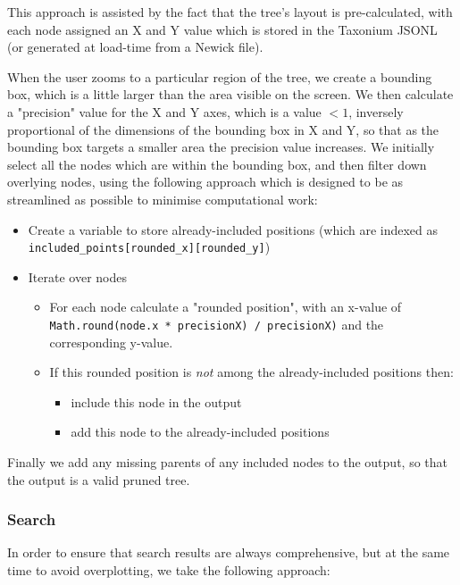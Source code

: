 \documentclass[twocolumn]{bioRxiv}
\begin{document}
This approach is assisted by the fact that the tree's layout is pre-calculated, with each node assigned an X and Y value which is stored in the Taxonium JSONL (or generated at load-time from a Newick file).

When the user zooms to a particular region of the tree, we create a bounding box, which is a little larger than the area visible on the screen. We then calculate a "precision" value for the X and Y axes, which is a value $<1$, inversely proportional of the dimensions of the bounding box in X and Y, so that as the bounding box targets a smaller area the precision value increases. We initially select all the nodes which are within the bounding box, and then filter down overlying nodes, using the following approach which is designed to be as streamlined as possible to minimise computational work:

\begin{itemize}
 \item Create a variable to store already-included  positions (which are indexed as\\ \texttt{included\_points[rounded\_x][rounded\_y]})
    \item Iterate over nodes
    \begin{itemize}
    \item For each node calculate a "rounded position", with an x-value of \texttt{Math.round(node.x * precisionX) / precisionX)} and the corresponding y-value.
    \item If this rounded position is \textit{not} among the already-included positions then:
    \begin{itemize}
    \item include this node in the output
    \item add this node to the already-included positions
    
    
    \end{itemize}
    
    \end{itemize}
\end{itemize}

Finally we add any missing parents of any included nodes to the output, so that the output is a valid pruned tree.

\subsubsection*{Search}

In order to ensure that search results are always comprehensive, but at the same time to avoid overplotting, we take the following approach:
\end{document}
